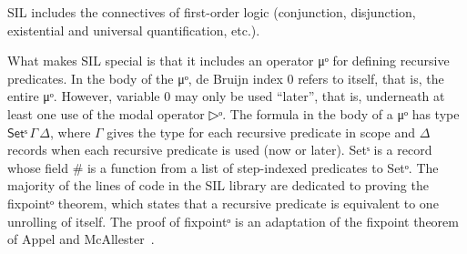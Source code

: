 SIL includes the connectives of first-order logic (conjunction,
disjunction, existential and universal quantification, etc.).

What makes SIL special is that it includes an operator μᵒ for defining
recursive predicates. In the body of the μᵒ, de Bruijn index 0 refers
to itself, that is, the entire μᵒ. However, variable 0 may only be
used ``later'', that is, underneath at least one use of the modal
operator ▷ᵒ.  The formula in the body of a μᵒ has type
$\mathsf{Set}ˢ\,Γ\,Δ$, where $Γ$ gives the type for each recursive
predicate in scope and $Δ$ records when each recursive predicate is
used (now or later). \textsf{Setˢ} is a record whose field \textsf{\#}
is a function from a list of step-indexed predicates to \textsf{Setᵒ}.
The majority of the lines of code in the SIL library are dedicated to
proving the \textsf{fixpointᵒ} theorem, which states that a recursive
predicate is equivalent to one unrolling of itself. The proof of
\textsf{fixpointᵒ} is an adaptation of the fixpoint theorem of Appel
and McAllester~\cite{Appel:2001aa}.

\begin{code}%
\>[0]\AgdaFunction{\AgdaUnderscore{}}\AgdaSpace{}%
\AgdaSymbol{:}%
\>[644I]\AgdaSpace{}%
\AgdaSymbol{:}\AgdaSpace{}%
\AgdaSymbol{)}\AgdaSpace{}%
\AgdaSymbol{(}\AgdaSpace{}%
\AgdaSymbol{:}\AgdaSpace{}%
\AgdaSpace{}%
\AgdaSpace{}%
\AgdaSpace{}%
\AgdaSymbol{(}\AgdaSpace{}%
\AgdaSpace{}%
\AgdaInductiveConstructor{[]}\AgdaSymbol{)}\AgdaSpace{}%
\AgdaSymbol{(}\AgdaSpace{}%
\AgdaSpace{}%
\AgdaSymbol{))}\AgdaSpace{}%
\AgdaSymbol{(}\AgdaSpace{}%
\AgdaSymbol{:}\AgdaSpace{}%
\AgdaSymbol{)}\<%
\\
\>[.][@{}l@{}]\<[644I]%
\>[4]\AgdaSpace{}%
\AgdaSpace{}%
\AgdaSpace{}%
\AgdaSpace{}%
\AgdaSpace{}%
\AgdaField{\#}\AgdaSpace{}%
\AgdaSymbol{(}\AgdaSpace{}%
\AgdaSymbol{)}\AgdaSpace{}%
\AgdaSymbol{(}\AgdaSpace{}%
\AgdaSpace{}%
\AgdaOperator{\AgdaInductiveConstructor{,}}\AgdaSpace{}%
\AgdaSymbol{)}\<%
\\
\>[0]\AgdaSymbol{\AgdaUnderscore{}}\AgdaSpace{}%
\AgdaSymbol{=}\AgdaSpace{}%
\AgdaSpace{}%
\AgdaSpace{}%
\AgdaSpace{}%
\AgdaSpace{}%
\AgdaSpace{}%
\AgdaSpace{}%
\AgdaSpace{}%
\<%
\end{code}


